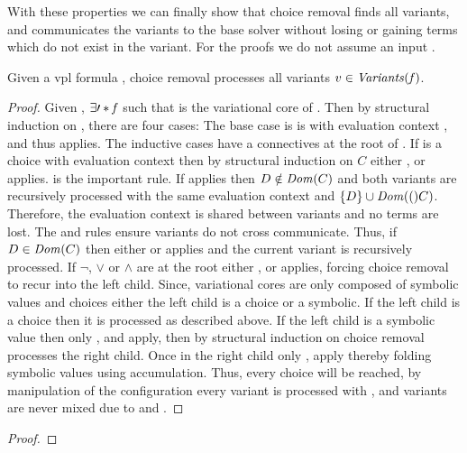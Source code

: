 With these properties we can finally show that choice removal finds all
variants, and communicates the variants to the base solver without losing or
gaining terms which do not exist in the variant. For the proofs we do not assume
an input \vc{}.

\begin{theorem}
  Given a \ac{vpl} formula \fV{}, choice removal processes all variants $v \in
  \mathit{Variants}(\mathit{f})$.
\end{theorem}
%
\begin{proof}
  Given \fV{}, $\exists \prime*{\mathit{f}}$ such that \prime*{\fV} is the variational
  core of \fV{}. Then by structural induction on \prime*{\fV{}}, there are four
  cases: The base case is \prime*{\fV} is \unit{} with evaluation context
  \inRoot{}, and thus \crEval{} applies. The inductive cases have a connectives
  at the root of \prime*{\fV}. If \prime*{\fV} is a choice with evaluation
  context \zV{} then by structural induction on $C$ either \crChc{}, \crChcT{}
  or \crChcF{} applies. \crChc{} is the important rule. If \crChc{} applies then
  $D \notin \mathit{Dom}({C})$ and both variants are recursively processed with the
  same evaluation context and $\set{D} \cup \domain(C)$. Therefore, the
  evaluation context is shared between variants and no terms are lost. The
  \crChcT{} and \crChcF{} rules ensure variants do not cross communicate. Thus,
  if $D \in \mathit{Dom}({C})$ then either \crChcT{} or \crChcF{} applies and the
  current variant is recursively processed. If $\neg$, $\vee$ or $\wedge$ are at
  the root either \crAnd{}, \crOr{} or \crNot{} applies, forcing choice removal
  to recur into the left child. Since, variational cores are only composed of
  symbolic values and choices either the left child is a choice or a symbolic.
  If the left child is a choice then it is processed as described above. If the
  left child is a symbolic value then only \crAndL{}, \crOrL{} and \crNotIn{}
  apply, then by structural induction on \zV{} choice removal processes the
  right child. Once in the right child only \crAndR{}, \crOrR{} apply thereby
  folding symbolic values using accumulation. Thus, every choice will be
  reached, by manipulation of the configuration every variant is processed with
  \crChc{}, and variants are never mixed due to \crChcT{} and \crChcF{}.
\end{proof}

\begin{theorem}

\end{theorem}
%
\begin{proof}

\end{proof}



